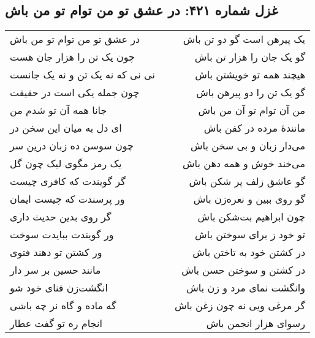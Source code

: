 \begin{center}
\section*{غزل شماره ۴۲۱: در عشق تو من توام تو من باش}
\label{sec:421}
\begin{longtable}{l p{0.5cm} r}
در عشق تو من توام تو من باش
&&
یک پیرهن است گو دو تن باش
\\
چون یک تن را هزار جان هست
&&
گو یک جان را هزار تن باش
\\
نی نی که نه یک تن و نه یک جانست
&&
هیچند همه تو خویشتن باش
\\
چون جمله یکی است در حقیقت
&&
گو یک تن را دو پیرهن باش
\\
جانا همه آن تو شدم من
&&
من آن توام تو آن من باش
\\
ای دل به میان این سخن در
&&
مانندهٔ مرده در کفن باش
\\
چون سوسن ده زبان درین سر
&&
می‌دار زبان و بی سخن باش
\\
یک رمز مگوی لیک چون گل
&&
می‌خند خوش و همه دهن باش
\\
گر گویندت که کافری چیست
&&
گو عاشق زلف پر شکن باش
\\
ور پرسندت که چیست ایمان
&&
گو روی ببین و نعره‌زن باش
\\
گر روی بدین حدیث داری
&&
چون ابراهیم بت‌شکن باش
\\
ور گویندت ببایدت سوخت
&&
تو خود ز برای سوختن باش
\\
ور کشتن تو دهند فتوی
&&
در کشتن خود به تاختن باش
\\
مانند حسین بر سر دار
&&
در کشتن و سوختن حسن باش
\\
انگشت‌زن فنای خود شو
&&
وانگشت نمای مرد و زن باش
\\
گه ماده و گاه نر چه باشی
&&
گر مرغی ویی نه چون زغن باش
\\
انجام ره تو گفت عطار
&&
رسوای هزار انجمن باش
\\
\end{longtable}
\end{center}
